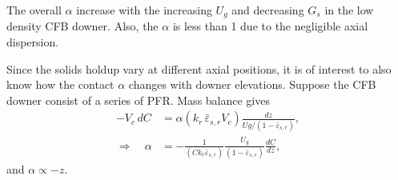 The overall $\alpha$ increase with the increasing $U_g$ and decreasing $G_s$ in the low density CFB downer.
Also, the $\alpha$ is less than 1 due to the negligible axial dispersion.

Since the solids holdup vary at different axial positions, it is of interest to also know how the contact $\alpha$ changes with downer elevations.
Suppose the CFB downer consist of a series of PFR.
Mass balance gives
\begin{align}
    -V_c \, dC
           & = \alpha(k_r\, \bar{\varepsilon}_{s,r} V_c) \frac{dz}{Ug/(1-\bar{\varepsilon}_{s,r})}, \\
    \Longrightarrow \quad
    \alpha & = -
    \frac{1}{(C k_r \bar{\varepsilon}_{s,r})}
    \frac{U_g}{(1-\bar{\varepsilon}_{s,r})}
    \frac{dC}{dz},
\end{align}
and $\alpha \propto - z$.